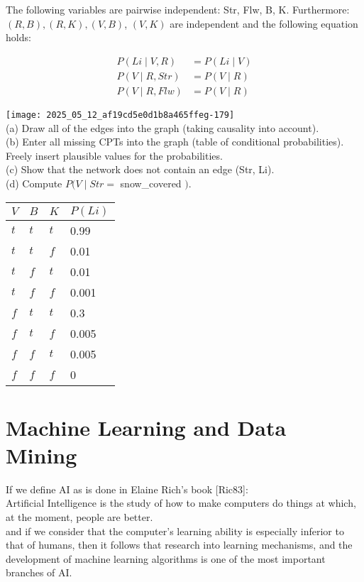 \documentclass[10pt]{article}
\begin{document}
The following variables are pairwise independent: Str, Flw, B, K. Furthermore: $(R, B),(R, K),(V, B)$, $(V, K)$ are independent and the following equation holds:

$$
\begin{aligned}
P(L i \mid V, R) & =P(L i \mid V) \\
P(V \mid R, S t r) & =P(V \mid R) \\
P(V \mid R, F l w) & =P(V \mid R)
\end{aligned}
$$

\texttt{[image: 2025\_05\_12\_af19cd5e0d1b8a465ffeg-179]}\\
(a) Draw all of the edges into the graph (taking causality into account).\\
(b) Enter all missing CPTs into the graph (table of conditional probabilities). Freely insert plausible values for the probabilities.\\
(c) Show that the network does not contain an edge (Str, Li).\\
(d) Compute $P(V \mid S t r=$ snow\_covered $)$.

\begin{center}
\begin{tabular}{llll}
\hline
$V$ & $B$ & $K$ & $P(L i)$ \\
\hline
$t$ & $t$ & $t$ & 0.99 \\
\hline
$t$ & $t$ & $f$ & 0.01 \\
\hline
$t$ & $f$ & $t$ & 0.01 \\
\hline
$t$ & $f$ & $f$ & 0.001 \\
\hline
$f$ & $t$ & $t$ & 0.3 \\
\hline
$f$ & $t$ & $f$ & 0.005 \\
\hline
$f$ & $f$ & $t$ & 0.005 \\
\hline
$f$ & $f$ & $f$ & 0 \\
\hline
\end{tabular}
\end{center}

\section*{Machine Learning and Data Mining}
If we define AI as is done in Elaine Rich's book [Ric83]:\\
Artificial Intelligence is the study of how to make computers do things at which, at the moment, people are better.\\
and if we consider that the computer's learning ability is especially inferior to that of humans, then it follows that research into learning mechanisms, and the development of machine learning algorithms is one of the most important branches of AI.
\end{document}
